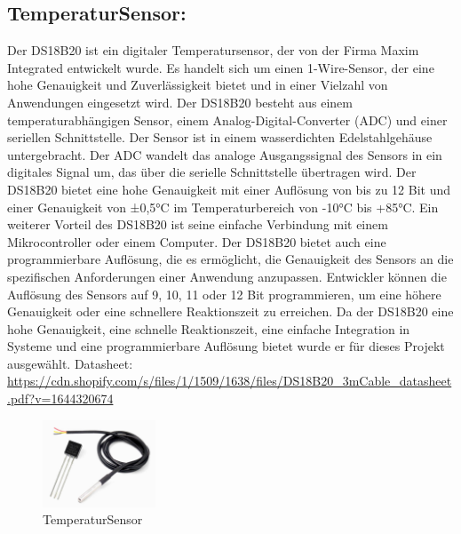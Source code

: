\subsection*{TemperaturSensor:}
Der DS18B20 ist ein digitaler Temperatursensor, der von der Firma Maxim Integrated entwickelt wurde. Es handelt sich um einen 1-Wire-Sensor, der eine hohe Genauigkeit und Zuverlässigkeit bietet und in einer Vielzahl von Anwendungen eingesetzt wird.
Der DS18B20 besteht aus einem temperaturabhängigen Sensor, einem Analog-Digital-Converter (ADC) und einer seriellen Schnittstelle. Der Sensor ist in einem wasserdichten Edelstahlgehäuse untergebracht.
Der ADC wandelt das analoge Ausgangssignal des Sensors in ein digitales Signal um, das über die serielle Schnittstelle übertragen wird.
Der DS18B20 bietet eine hohe Genauigkeit mit einer Auflösung von bis zu 12 Bit und einer Genauigkeit von ±0,5°C im Temperaturbereich von -10°C bis +85°C.
Ein weiterer Vorteil des DS18B20 ist seine einfache Verbindung mit einem Mikrocontroller oder einem Computer. 
Der DS18B20 bietet auch eine programmierbare Auflösung, die es ermöglicht, die Genauigkeit des Sensors an die spezifischen Anforderungen einer Anwendung anzupassen. Entwickler können die Auflösung des Sensors auf 9, 10, 11 oder 12 Bit programmieren, um eine höhere Genauigkeit oder eine schnellere Reaktionszeit zu erreichen.
Da der DS18B20 eine hohe Genauigkeit, eine schnelle Reaktionszeit, eine einfache Integration in Systeme und eine programmierbare Auflösung bietet wurde er für dieses Projekt ausgewählt. 
\newline
Datasheet: \url{https://cdn.shopify.com/s/files/1/1509/1638/files/DS18B20_3mCable_datasheet.pdf?v=1644320674}

\begin{figure}[b]
    \centering
    \includegraphics[width=0.3\textwidth]{./pics/TempSensBild.jpeg}
    \caption{TemperaturSensor}
    \label{fig:TemperaturSensor}
\end{figure}
\cite{TemperaturSensor}



\newpage
